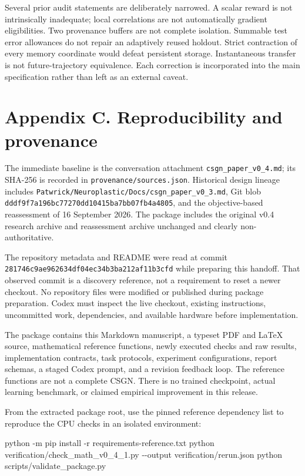 \documentclass[
  11pt,
  a4paper,
]{article}
\newenvironment{Shaded}{}{}
\newcommand{\AttributeTok}[1]{\textcolor[rgb]{0.49,0.56,0.16}{#1}}
\newcommand{\ExtensionTok}[1]{#1}
\newcommand{\NormalTok}[1]{#1}
\begin{document}
Several prior audit statements are deliberately narrowed. A scalar
reward is not intrinsically inadequate; local correlations are not
automatically gradient eligibilities. Two provenance buffers are not
complete isolation. Summable test error allowances do not repair an
adaptively reused holdout. Strict contraction of every memory coordinate
would defeat persistent storage. Instantaneous transfer is not
future-trajectory equivalence. Each correction is incorporated into the
main specification rather than left as an external caveat.

\section{Appendix C. Reproducibility and
provenance}\label{appendix-c.-reproducibility-and-provenance}

The immediate baseline is the conversation attachment
\texttt{csgn\_paper\_v0\_4.md}; its SHA-256 is recorded in
\texttt{provenance/sources.json}. Historical design lineage includes
\nolinkurl{Patwrick/Neuroplastic/Docs/csgn_paper_v0_3.md}, Git blob
\nolinkurl{dddf9f7a196bc77270dd10415ba7bb07fb4a4805}, and the
objective-based reassessment of 16 September 2026. The package includes
the original v0.4 research archive and reassessment archive unchanged
and clearly non-authoritative.

The repository metadata and README were read at commit
\nolinkurl{281746c9ae962634df04ec34b3ba212af11b3cfd} while preparing
this handoff. That observed commit is a discovery reference, not a
requirement to reset a newer checkout. No repository files were modified
or published during package preparation. Codex must inspect the live
checkout, existing instructions, uncommitted work, dependencies, and
available hardware before implementation.

The package contains this Markdown manuscript, a typeset PDF and LaTeX
source, mathematical reference functions, newly executed checks and raw
results, implementation contracts, task protocols, experiment
configurations, report schemas, a staged Codex prompt, and a revision
feedback loop. The reference functions are not a complete CSGN. There is
no trained checkpoint, actual learning benchmark, or claimed empirical
improvement in this release.

From the extracted package root, use the pinned reference dependency
list to reproduce the CPU checks in an isolated environment:

\begin{Shaded}
\begin{Highlighting}[]
\ExtensionTok{python} \AttributeTok{{-}m}\NormalTok{ pip install }\AttributeTok{{-}r}\NormalTok{ requirements{-}reference.txt}
\ExtensionTok{python}\NormalTok{ verification/check\_math\_v0\_4\_1.py }\AttributeTok{{-}{-}output}\NormalTok{ verification/rerun.json}
\ExtensionTok{python}\NormalTok{ scripts/validate\_package.py}
\end{Highlighting}
\end{Shaded}
\end{document}
